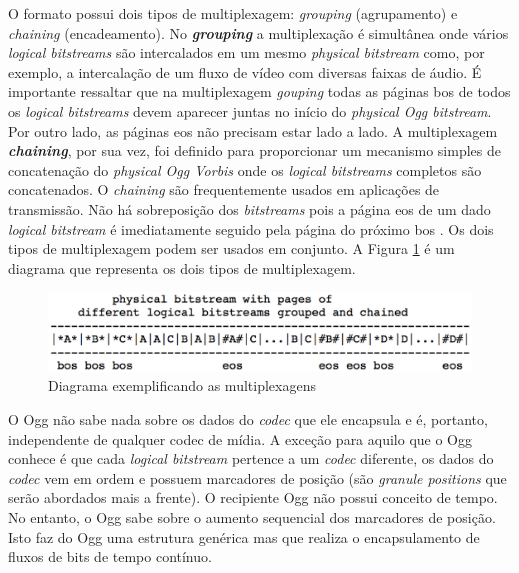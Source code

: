  O formato possui dois tipos de multiplexagem: \textit{grouping} (agrupamento) e \textit{chaining} (encadeamento). No \textbf{\textit{grouping}} a multiplexação é simultânea onde vários \textit{logical bitstreams} são intercalados em um mesmo \textit{physical bitstream} como, por exemplo, a intercalação de um fluxo de vídeo com diversas faixas de áudio. É importante ressaltar que na multiplexagem \textit{gouping} todas as páginas bos de todos os \textit{logical bitstreams} devem aparecer juntas no início do \textit{physical Ogg bitstream}. Por outro lado, as páginas eos não precisam estar lado a lado. A multiplexagem \textbf{\textit{chaining}}, por sua vez, foi definido para proporcionar um mecanismo simples de concatenação do \textit{physical Ogg Vorbis} onde os \textit{logical bitstreams} completos são concatenados. O \textit{chaining} são frequentemente usados em aplicações de transmissão. Não há sobreposição dos \textit{bitstreams} pois a página eos de um dado \textit{logical bitstream} é imediatamente seguido pela página do próximo bos \cite{ogg}. Os dois tipos de multiplexagem podem ser usados em conjunto. A Figura \ref{multiplexogg} é um diagrama que representa os dois tipos de multiplexagem.

 \begin{figure}[ht]
	\centering
		\includegraphics[keepaspectratio=true,scale=0.7]{figuras/multiplexogg.eps}
	\caption{Diagrama exemplificando as multiplexagens \cite{ogg}}
	\label{multiplexogg}
\end{figure}

O Ogg não sabe nada sobre os dados do \textit{codec} que ele encapsula e é, portanto, independente de qualquer codec de mídia. A exceção para aquilo que o Ogg conhece é que cada \textit{logical bitstream} pertence a um \textit{codec} diferente, os dados do \textit{codec} vem em ordem e possuem marcadores de posição (são \textit{granule positions} que serão abordados mais a frente). O recipiente Ogg não possui conceito de tempo. No entanto, o Ogg sabe sobre o aumento sequencial dos marcadores de posição. Isto faz do Ogg uma estrutura genérica mas que realiza o encapsulamento de fluxos de bits de tempo contínuo.

